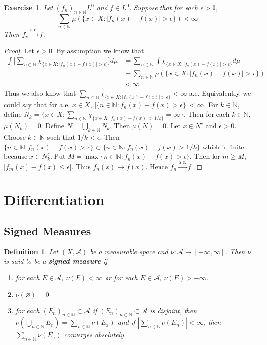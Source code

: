 \documentclass[12pt]{amsart}
\newtheorem{defn}[thm]{Definition}
\newtheorem{ex}[thm]{Exercise}
\newcommand{\ep}{\epsilon}
\newcommand{\N}{\mathbb{N}}
\newcommand{\MA}{\mathcal{A}}
\newcommand{\convt}[1]{\xrightarrow{\text{#1}}}
\begin{document}
\begin{ex}
	Let $(f_n)_{n \in \N} L^0$ and $f \in L^0$. Suppose that for each $\ep >0$, $$\sum_{n \in \N}\mu(\{x \in X: |f_n(x)-f(x)| > \ep\}) < \infty$$
	Then $f_n \convt{a.e.} f$.
\end{ex}

\begin{proof}
	Let $\ep>0$. By assumption we know that
	\begin{align*}
		\int \bigg[ \sum_{n \in \N}\chi_{\{x \in X: |f_n(x)-f(x)| > \ep\}}\bigg] d \mu 
		&= \sum_{n \in \N}\int \chi_{\{x \in X: |f_n(x)-f(x)| > \ep\}}d \mu\\
		&=\sum_{n \in \N}\mu(\{x \in X: |f_n(x)-f(x)| > \ep\})\\
		& < \infty
	\end{align*}
	Thus we also know that $\sum_{n \in \N}\chi_{\{x \in X: |f_n(x)-f(x)| > \ep\}} < \infty$ a.e. Equivalently, we could say that for a.e. $x \in X$, $|\{n \in \N: f_n(x) - f(x) > \ep\}| < \infty$. For $k \in \N$, define $N_k = \{x \in X: \sum_{n \in \N}\chi_{\{x \in X: |f_n(x)-f(x)| > 1/k\}} = \infty\}$. Then for each $k \in \N$, $\mu(N_k) = 0$. Define $N = \bigcup_{k \in \N} N_k$. Then $\mu(N) = 0$. Let $x \in N^c$ and $\ep > 0$. Choose $k \in \N$ such that $1/k < \ep$. Then $\{n \in \N: f_n(x) - f(x) > \ep\} \subset \{n \in \N: f_n(x) - f(x) > 1/k\}$ which is finite because $x \in N_k^c$. Put $M = \max\{n \in \N: f_n(x) - f(x) > \ep\}$. Then for $m \geq M$, $|f_m(x) - f(x) \leq \ep|$. Thus $f_n(x) \rightarrow f(x)$. Hence $f_n \convt{a.e.} f$.
\end{proof}

\section{Differentiation}

\subsection{Signed Measures}

\begin{defn}
	Let $(X, \MA)$ be a measurable space and $\nu : \MA \rightarrow [-\infty, \infty]$. Then $\nu$ is said to be a \textbf{signed measure} if 
	\begin{enumerate}
		\item for each $E \in \MA$, $\nu(E) < \infty$ or for each $E \in \MA$, $\nu(E) > -\infty$.
		\item $\nu(\varnothing) = 0$
		\item for each $(E_n)_{n \in \N} \subset \MA$ if $(E_n)_{n \in \N} \subset \MA$ is disjoint, then $\nu(\bigcup\limits_{n \in \N} E_n) = \sum\limits_{n \in \N} \nu(E_n)$ and if $|\sum\limits_{n \in \N} \nu(E_n)| < \infty$, then $\sum\limits_{n \in \N} \nu(E_n)$ converges absolutely.
	\end{enumerate}
\end{defn}
\end{document}
